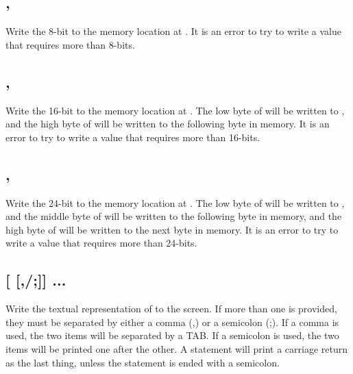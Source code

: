 \documentclass{article}
\begin{document}
    \subsection{ , }

    Write the 8-bit  to the memory location at .
    It is an error to try to write a value that requires more than 8-bits.

    \subsection{ , }

    Write the 16-bit  to the memory location at .
    The low byte of  will be written to , and
    the high byte of  will be written to the following byte in memory.
    It is an error to try to write a value that requires more than 16-bits.    

    \subsection{ , }

    Write the 24-bit  to the memory location at .
    The low byte of  will be written to , and
    the middle byte of  will be written to the following byte in memory,
    and the high byte of  will be written to the next byte in memory.
    It is an error to try to write a value that requires more than 24-bits.  

    \subsection{ [ [,/;]] ...}

    Write the textual representation of  to the screen.
    If more than one  is provided, they must be separated by either a comma (,)
    or a semicolon (;).
    If a comma is used, the two items will be separated by a TAB.
    If a semicolon is used, the two items will be printed one after the other.
    A  statement will print a carriage return as the last thing, unless the
    statement is ended with a semicolon.

    \subsection{ }
\end{document}
